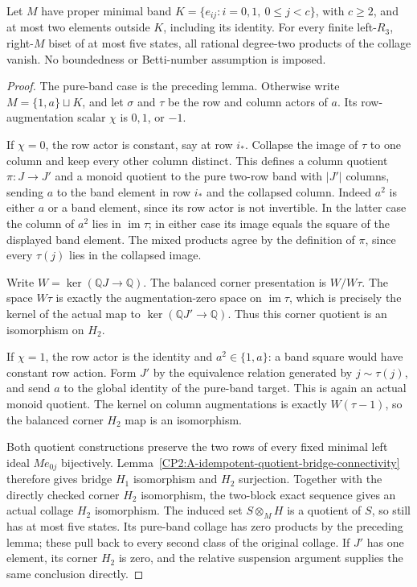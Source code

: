 \begin{theorem}
\label{CP2:A-two-row-one-extra-five-states}
Let $M$ have proper minimal band $K=\{e_{ij}:i=0,1,
\ 0\le j<c\}$, with $c\ge2$, and at most two elements
outside $K$, including its identity.
For every finite left-$R_3$, right-$M$ biset of at most
five states, all rational degree-two products of the
collage vanish.  No boundedness or Betti-number assumption
is imposed.
\end{theorem}
\begin{proof}
The pure-band case is the preceding lemma.  Otherwise
write $M=\{1,a\}\sqcup K$, and let $\sigma$ and $\tau$
be the row and column actors of $a$.  Its row-augmentation
scalar $\chi$ is $0,1$, or $-1$.

If $\chi=0$, the row actor is constant, say at row $i_*$.
Collapse the image of $\tau$ to one column and keep every
other column distinct.  This defines a column quotient
$\pi:J\to J'$ and a monoid quotient to the pure two-row
band with $|J'|$ columns, sending $a$ to the band element
in row $i_*$ and the collapsed column.
Indeed $a^2$ is either $a$ or a band element, since its
row actor is not invertible.  In the latter case the
column of $a^2$ lies in $\operatorname{im}\tau$; in either
case its image equals the square of the displayed band
element.  The mixed products agree by the definition of
$\pi$, since every $\tau(j)$ lies in the collapsed image.

Write $W=\ker(\mathbb QJ\to\mathbb Q)$.
The balanced corner presentation is $W/W\tau$.
The space $W\tau$ is exactly the augmentation-zero
space on $\operatorname{im}\tau$, which is precisely
the kernel of the actual map to
$\ker(\mathbb QJ'\to\mathbb Q)$.
Thus this corner quotient is an isomorphism on $H_2$.

If $\chi=1$, the row actor is the identity and
$a^2\in\{1,a\}$: a band square would have constant
row action.  Form $J'$ by the equivalence relation
generated by $j\sim\tau(j)$, and send $a$ to the
global identity of the pure-band target.  This is
again an actual monoid quotient.  The kernel on
column augmentations is exactly $W(\tau-1)$,
so the balanced corner $H_2$ map is an isomorphism.

Both quotient constructions preserve the two rows of
every fixed minimal left ideal $Me_{0j}$ bijectively.
Lemma~\ref{CP2:A-idempotent-quotient-bridge-connectivity}
therefore gives bridge $H_1$ isomorphism and $H_2$
surjection.  Together with the directly checked corner
$H_2$ isomorphism, the two-block exact sequence gives
an actual collage $H_2$ isomorphism.
The induced set $S\otimes_M H$ is a quotient of $S$,
so still has at most five states.  Its pure-band collage
has zero products by the preceding lemma; these pull
back to every second class of the original collage.
If $J'$ has one element, its corner $H_2$ is zero,
and the relative suspension argument supplies the
same conclusion directly.


\end{proof}
